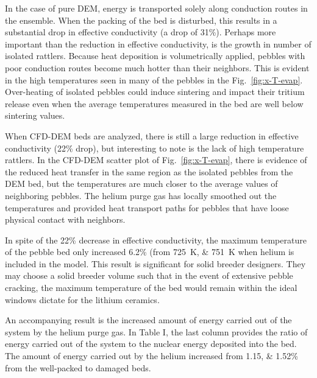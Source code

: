 In the case of pure DEM, energy is transported solely along conduction routes in the ensemble. When the packing of the bed is disturbed, this results in a substantial drop in effective conductivity (a drop of 31\%). Perhaps more important than the reduction in effective conductivity, is the growth in number of isolated rattlers. Because heat deposition is volumetrically applied, pebbles with poor conduction routes become much hotter than their neighbors. This is evident in the high temperatures seen in many of the pebbles in the Fig.~\ref{fig:x-T-evap}. Over-heating of isolated pebbles could induce sintering and impact their tritium release even when the average temperatures measured in the bed are well below sintering values.

When CFD-DEM beds are analyzed, there is still a large reduction in effective conductivity (22\% drop), but interesting to note is the lack of high temperature rattlers. In the CFD-DEM scatter plot of Fig.~\ref{fig:x-T-evap}, there is evidence of the reduced heat transfer in the same region as the isolated pebbles from the DEM bed, but the temperatures are much closer to the average values of neighboring pebbles. The helium purge gas has locally smoothed out the temperatures and provided heat transport paths for pebbles that have loose physical contact with neighbors.

In spite of the 22\% decrease in effective conductivity, the maximum temperature of the pebble bed only increased 6.2\% (from \SIlist{725;751}{\kelvin} when helium is included in the model. This result is significant for solid breeder designers. They may choose a solid breeder volume such that in the event of extensive pebble cracking, the maximum temperature of the bed would remain within the ideal windows dictate for the lithium ceramics.

An accompanying result is the increased amount of energy carried out of the system by the helium purge gas. In Table I, the last column provides the ratio of energy carried out of the system to the nuclear energy deposited into the bed. The amount of energy carried out by the helium increased from \numlist{1.15;1.52}\% from the well-packed to damaged beds.

